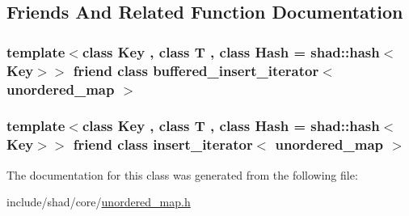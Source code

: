 \subsection{Friends And Related Function Documentation}
\hypertarget{classshad_1_1unordered__map_a178983bb5902294d2c70ed8b802b4a03}{
\subsubsection[{buffered\-\_\-insert\-\_\-iterator$<$ unordered\-\_\-map $>$}]{\setlength{\rightskip}{0pt plus 5cm}template$<$class Key , class T , class Hash  = shad\-::hash$<$\-Key$>$$>$ friend class {\bf buffered\-\_\-insert\-\_\-iterator}$<$ {\bf unordered\-\_\-map} $>$\hspace{0.3cm}{\ttfamily [friend]}}}\label{classshad_1_1unordered__map_a178983bb5902294d2c70ed8b802b4a03}
\hypertarget{classshad_1_1unordered__map_a585b0ce25cd77eb35696929ffdc9fffe}{
\subsubsection[{insert\-\_\-iterator$<$ unordered\-\_\-map $>$}]{\setlength{\rightskip}{0pt plus 5cm}template$<$class Key , class T , class Hash  = shad\-::hash$<$\-Key$>$$>$ friend class {\bf insert\-\_\-iterator}$<$ {\bf unordered\-\_\-map} $>$\hspace{0.3cm}{\ttfamily [friend]}}}\label{classshad_1_1unordered__map_a585b0ce25cd77eb35696929ffdc9fffe}


The documentation for this class was generated from the following file\-:\begin{DoxyCompactItemize}
\item 
include/shad/core/\hyperlink{unordered__map_8h}{unordered\-\_\-map.\-h}\end{DoxyCompactItemize}
